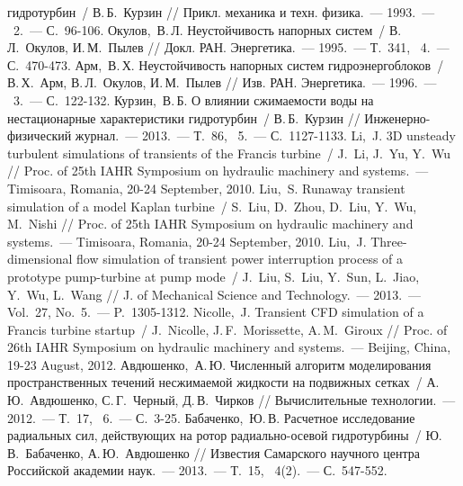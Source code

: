 \begin{thebibliography}{999}
                гидротурбин~/ В.\,Б.~Курзин // Прикл. механика и техн. физика.~--- 1993.~--- \No~2.~--- 
                С.~96-106.
%
\Rus
{} Окулов,~В.\,Л. Неустойчивость напорных систем~/ В.\,Л.~Окулов, И.\,М.~Пылев // Докл. РАН. 
                Энергетика.~--- 1995.~--- Т.~341, \No~4.~--- С.~470-473.
%
\Rus
{} Арм,~В.\,Х. Неустойчивость напорных систем гидроэнергоблоков~/ В.\,Х.~Арм, 
                В.\,Л.~Окулов, И.\,М.~Пылев // Изв. РАН. Энергетика.~--- 1996.~--- \No~3.~--- С.~122-132.
%
\Rus
{} Курзин,~В.\,Б. О влиянии сжимаемости воды на нестационарные характеристики гидротурбин~/ 
                В.\,Б.~Курзин // Инженерно-физический журнал.~--- 2013.~--- Т.~86, \No~5.~--- С.~1127-1133.
%
\Eng 
{}    Li,~J. 3D unsteady turbulent simulations of transients of the Francis 
                turbine~/ J.~Li, J.~Yu, Y.~Wu // Proc. of 25th IAHR Symposium on hydraulic machinery and 
                systems.~--- Timisoara, Romania, 20-24 September, 2010.
%
\Eng 
{}  Liu,~S. Runaway transient simulation of a model Kaplan turbine~/ S.~Liu, D.~Zhou, D.~Liu, 
                Y.~Wu, M.~Nishi // Proc. of 25th IAHR Symposium on hydraulic machinery and systems.~--- 
                Timisoara, Romania, 20-24 September, 2010.
%
\Eng 
{}  Liu,~J. Three-dimensional flow simulation of transient power interruption process 
                of a prototype pump-turbine at pump mode~/ J.~Liu, S.~Liu, Y.~Sun, L.~Jiao, Y.~Wu, L.~Wang // 
                J. of Mechanical Science and Technology.~--- 2013.~--- Vol.~27, No.~5.~--- P.~1305-1312.
%
\Eng 
{} Nicolle,~J. Transient CFD simulation of a Francis turbine startup~/ J.~Nicolle, 
                  J.\,F.~Morissette, A.\,M.~Giroux // Proc. of 26th IAHR Symposium on hydraulic machinery and 
                  systems.~--- Beijing, China, 19-23 August, 2012.
%
\Rus
{} Авдюшенко,~А.\,Ю. Численный алгоритм моделирования пространственных течений несжимаемой 
              жидкости на подвижных сетках~/ А.\,Ю.~Авдюшенко, С.\,Г.~Черный, Д.\,В.~Чирков // 
              Вычислительные технологии.~--- 2012.~--- Т.~17, \No~6.~--- С.~3-25.
\Rus
{} Бабаченко,~Ю.\,В. Расчетное исследование радиальных сил, действующих на 
              ротор радиально-осевой гидротурбины~/ Ю.\,В.~Бабаченко, А.\,Ю.~Авдюшенко // 
              Известия Самарского научного центра Российской академии наук.~--- 2013.~--- 
              Т.~15, \No~4(2).~--- С.~547-552.

\end{thebibliography}
